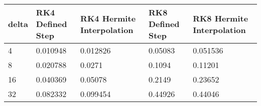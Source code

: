 \begin{tabular}{lllll}
delta & RK4 Defined Step & RK4 Hermite Interpolation & RK8 Defined Step & RK8 Hermite Interpolation \\ 
\hline 
4 & 0.010948 & 0.012826 & 0.05083 & 0.051536 \\ 
8 & 0.020788 & 0.0271 & 0.1094 & 0.11201 \\ 
16 & 0.040369 & 0.05078 & 0.2149 & 0.23652 \\ 
32 & 0.082332 & 0.099454 & 0.44926 & 0.44046 \\ 
\hline 
\end{tabular}